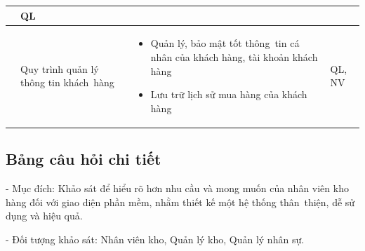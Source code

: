 \documentclass[a4paper,12pt]{report}
\begin{document}
\begin{center}
\begin{longtable}{|>{\centering\arraybackslash}c|
        >{\centering\arraybackslash}p{4cm}|
        >{\centering\arraybackslash}p{6.5cm}|
        >{\centering\arraybackslash}p{4cm}|}
\begin{itemize}
        \end{itemize}       & QL                                                 \\
        \hline
        7                                                                                 & Quy trình quản lý thông tin khách~hàng
                                                                                          &
        \begin{itemize}
            \item Quản lý, bảo mật tốt thông~tin cá nhân của khách hàng, tài khoản khách hàng
            \item Lưu trữ lịch sử mua hàng của khách hàng
        \end{itemize} & QL, NV                                           \\
        \hline
    \end{longtable}
\end{center}
\subsection{Bảng câu hỏi chi tiết}
- Mục đích: Khảo sát để hiểu rõ hơn nhu cầu và mong muốn của nhân viên kho hàng đối với giao diện phần mềm, nhằm thiết kế một hệ thống thân~thiện, dễ sử dụng và hiệu quả.

\vspace{0.8em}

- Đối tượng khảo sát: Nhân viên kho, Quản lý kho, Quản lý nhân sự.
\end{document}
